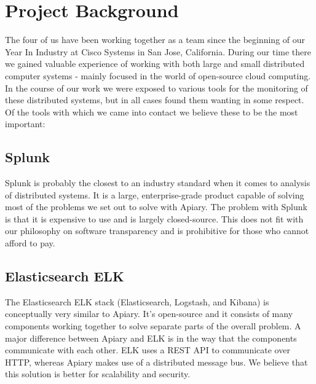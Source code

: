 \section{Project Background}

The four of us have been working together as a team since the beginning of our
Year In Industry at Cisco Systems in San Jose, California. During our time there
we gained valuable experience of working with both large and small distributed
computer systems - mainly focused in the world of open-source cloud computing.
In the course of our work we were exposed to various tools for the monitoring of
these distributed systems, but in all cases found them wanting in some respect.
Of the tools with which we came into contact we believe these to be the most
important:

\subsection{Splunk}

Splunk\cite{splunk} is probably the closest to an industry standard when it comes to
analysis of distributed systems. It is a large, enterprise-grade product capable
of solving most of the problems we set out to solve with Apiary. The problem
with Splunk is that it is expensive to use and is largely closed-source. This
does not fit with our philosophy on software transparency and is prohibitive for
those who cannot afford to pay.

\subsection{Elasticsearch ELK}

The Elasticsearch ELK\cite{elk} stack (Elasticsearch, Logstash, and Kibana) is
conceptually very similar to Apiary. It’s open-source and it consists of many
components working together to solve separate parts of the overall problem. A
major difference between Apiary and ELK is in the way that the components
communicate with each other. ELK uses a REST API to communicate over HTTP,
whereas Apiary makes use of a distributed message bus. We believe that this
solution is better for scalability and security.
